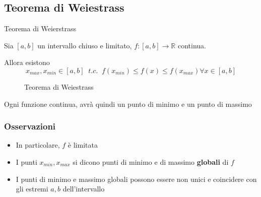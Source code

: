 \documentclass[a4paper]{article}
\theoremstyle{break}
\theoremstyle{break}
\theoremstyle{break}
\theoremstyle{break}
\begin{document}
\subsection{Teorema di Weiestrass}
\begin{definition}
	Teorema di Weierstrass

	Sia \( [a, b] \) un intervallo chiuso e limitato, \( f: [a,b]  \to \mathbb{R}\) continua.

	Allora esistono
	\[
		x_{max}, x_{min} \in [a,b]\;\; t.c.\;\; f(x_{min}) \le f(x) \le f(x_{max}) \forall x \in [a,b]
	\]
	\begin{figure}[H]
		\begin{center}
		\end{center}
		\caption{Teorema di Weiestrass}
	\end{figure}
	Ogni funzione continua, avrà quindi un punto di minimo e un punto di massimo
\end{definition}
\subsubsection{Osservazioni}
\begin{itemize}
	\item In particolare, \( f \) è limitata
	\item I punti \( x_{min}, x_{max} \) si dicono punti di minimo e di massimo \textbf{globali} di \( f \)
	\item I punti di minimo e massimo globali possono essere non unici e coincidere con gli estremi
	      \( a,b \) dell'intervallo
\end{itemize}
\end{document}
